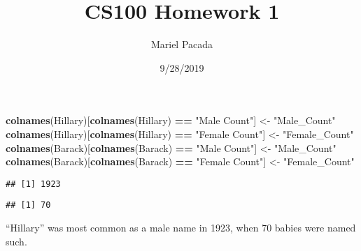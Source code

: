 \documentclass[]{article}
\title{CS100 Homework 1}
\author{Mariel Pacada}
\date{9/28/2019}
\newenvironment{Shaded}{\begin{snugshade}}{\end{snugshade}}
\newcommand{\DecValTok}[1]{\textcolor[rgb]{0.00,0.00,0.81}{#1}}
\newcommand{\KeywordTok}[1]{\textcolor[rgb]{0.13,0.29,0.53}{\textbf{#1}}}
\newcommand{\NormalTok}[1]{#1}
\newcommand{\OperatorTok}[1]{\textcolor[rgb]{0.81,0.36,0.00}{\textbf{#1}}}
\newcommand{\StringTok}[1]{\textcolor[rgb]{0.31,0.60,0.02}{#1}}
\begin{document}
\maketitle

\begin{Shaded}
\begin{Highlighting}[]
\KeywordTok{colnames}\NormalTok{(Hillary)[}\KeywordTok{colnames}\NormalTok{(Hillary) }\OperatorTok{==}\StringTok{ "Male Count"}\NormalTok{] <-}\StringTok{ "Male_Count"}
\KeywordTok{colnames}\NormalTok{(Hillary)[}\KeywordTok{colnames}\NormalTok{(Hillary) }\OperatorTok{==}\StringTok{ "Female Count"}\NormalTok{] <-}\StringTok{ "Female_Count"}
\KeywordTok{colnames}\NormalTok{(Barack)[}\KeywordTok{colnames}\NormalTok{(Barack) }\OperatorTok{==}\StringTok{ "Male Count"}\NormalTok{] <-}\StringTok{ "Male_Count"}
\KeywordTok{colnames}\NormalTok{(Barack)[}\KeywordTok{colnames}\NormalTok{(Barack) }\OperatorTok{==}\StringTok{ "Female Count"}\NormalTok{] <-}\StringTok{ "Female_Count"}
\end{Highlighting}
\end{Shaded}

\begin{Shaded}
\end{Shaded}

\begin{verbatim}
## [1] 1923
\end{verbatim}

\begin{Shaded}
\end{Shaded}

\begin{verbatim}
## [1] 70
\end{verbatim}

``Hillary'' was most common as a male name in 1923, when 70 babies were
named such.

\begin{Shaded}
\end{Shaded}
\end{document}
